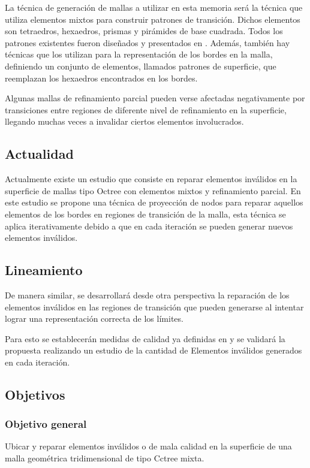 La técnica de generación de mallas a utilizar en esta memoria será la técnica que utiliza elementos mixtos para construir patrones de transición.
Dichos elementos son tetraedros, hexaedros, prismas y pirámides de base cuadrada. Todos los patrones existentes fueron diseñados y presentados en \cite{Gonzalez2014}. Además, también hay técnicas que los utilizan para la representación de los bordes en la malla, definiendo un conjunto de elementos, llamados patrones de superficie, que reemplazan los hexaedros encontrados en los bordes.

Algunas mallas de refinamiento parcial pueden verse afectadas negativamente por transiciones entre regiones de diferente nivel de refinamiento en la superficie, llegando muchas veces a invalidar ciertos elementos involucrados. 

\subsection{Actualidad}

Actualmente existe un estudio \cite{daines2018repairing} que consiste en reparar elementos inválidos en la superficie de mallas tipo Octree con elementos mixtos y refinamiento parcial. En este estudio se propone una técnica de proyección de nodos para reparar aquellos elementos de los bordes en regiones de transición de la malla, esta técnica se aplica iterativamente debido a que en cada iteración se pueden generar nuevos elementos inválidos.


\subsection{Lineamiento}

De manera similar, se desarrollará desde otra perspectiva la reparación de los elementos inválidos en las regiones de transición que pueden generarse al intentar lograr una representación correcta de los límites.

Para esto se establecerán medidas de calidad ya definidas en  \cite{daines2018repairing} y se validará la propuesta realizando un estudio de la cantidad de Elementos inválidos generados en cada iteración.

\subsection{Objetivos}
\subsubsection{Objetivo general}
Ubicar y reparar elementos inválidos o de mala calidad en la superficie de una malla geométrica tridimensional de tipo Cctree mixta.

